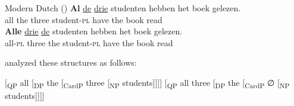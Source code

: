 \documentclass[output=paper,colorlinks,citecolor=brown]{langscibook}
\begin{document}
\ea\label{ex:men39}
Modern Dutch (\cite[][160]{Cirillo2009})
\ea\label{ex:men39a} \gll \textbf{Al} \ul{de} \ul{drie} studenten	hebben	het	boek	gelezen.\\
all	the	three	student-\textsc{pl}	have the book read\\
\ex\label{ex:men39b} \gll \textbf{Alle} \ul{drie}	\ul{de}	studenten	hebben	het	boek gelezen.\\
all-\textsc{pl}	three 	the	student-\textsc{pl}	have the book read\\
\z
\z

\citet[][160]{Cirillo2009} analyzed these structures as follows:

\ea\label{ex:men40}
\ea\label{ex:men40a} {[}\textsubscript{QP} all {[}\textsubscript{DP} the  {[}\textsubscript{CardP} three {[}\textsubscript{NP} students{]}{]}{]}{]}
\ex\label{ex:men40b} {[}\textsubscript{QP} all three {[}\textsubscript{DP} the {[}\textsubscript{CardP} ∅ {[}\textsubscript{NP} students{]}{]}{]}{]}
\z
\z\largerpage
\end{document}
